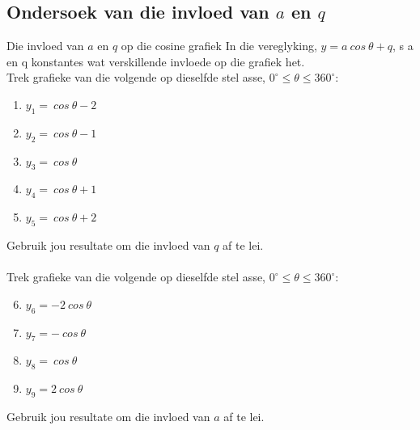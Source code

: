 \subsection*{Ondersoek van die invloed van $a$ en $q$}
\nopagebreak
\begin{Investigation}{Die invloed van $a$ en $q$ op die cosine grafiek}
In die vereglyking, $y=a~cos~\theta+q$, s a en q konstantes wat verskillende invloede op die
grafiek het.
\\

Trek grafieke van die volgende op dieselfde stel asse, $0^{\circ} \leq \theta \leq 360^{\circ}$:
\begin{enumerate}[noitemsep, label=\textbf{\arabic*}. ] 
\item $y_1=~cos~\theta -2$
\item $y_2=~cos~\theta -1$
\item $y_3=~cos~\theta $
\item $y_4=~cos~\theta +1$
\item $y_5=~cos~\theta +2$
\end{enumerate}
Gebruik jou resultate om die invloed van $q$ af te lei.\\
\\
Trek grafieke van die volgende op dieselfde stel asse, $0^{\circ} \leq \theta \leq 360^{\circ}$:
\begin{enumerate}[noitemsep, label=\textbf{\arabic*}. ] 
\setcounter{enumi}{5}
\item $y_6=-2~cos~\theta $
\item $y_7=-~cos~\theta $
\item $y_8=~cos~\theta $
\item $y_9=2~cos~\theta $\end{enumerate}
Gebruik jou resultate om die invloed van $a$ af te lei.
\end{Investigation}

